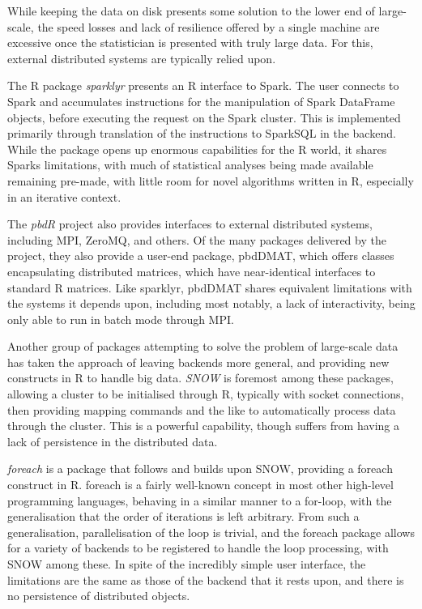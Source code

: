 \documentclass[a4paper,10pt]{article}
\begin{document}
While keeping the data on disk presents some solution to the lower end of
large-scale, the speed losses and lack of resilience offered by a single
machine are excessive once the statistician is presented with truly large data.
For this, external distributed systems are typically relied upon.

The R package \textit{sparklyr} presents an R interface to Spark\cite{luraschi20}.
The user connects to Spark and accumulates instructions for the manipulation of
Spark DataFrame objects, before executing the request on the Spark cluster.
This is implemented primarily through translation of the instructions to
SparkSQL in the backend.
While the package opens up enormous capabilities for the R world, it shares
Sparks limitations, with much of statistical analyses being made available
remaining pre-made, with little room for novel algorithms written in R,
especially in an iterative context.

The \textit{pbdR} project also provides interfaces to external distributed systems,
including MPI, ZeroMQ, and others\cite{pbdR2012}\cite{pbdBASEpackage}.
Of the many packages delivered by the project, they also provide a user-end
package, pbdDMAT, which offers classes encapsulating distributed matrices,
which have near-identical interfaces to standard R matrices.
Like sparklyr, pbdDMAT shares equivalent limitations with the systems it
depends upon, including most notably, a lack of interactivity, being only able
to run in batch mode through MPI.

Another group of packages attempting to solve the problem of large-scale data
has taken the approach of leaving backends more general, and providing new
constructs in R to handle big data.
\textit{SNOW} is foremost among these packages, allowing a cluster to be
initialised through R, typically with socket connections, then providing
mapping commands and the like to automatically process data through the
cluster\cite{tierney18}.
This is a powerful capability, though suffers from having a lack of persistence
in the distributed data.

\textit{foreach} is a package that follows and builds upon SNOW, providing a
foreach construct in R\cite{microsoft20}.
foreach is a fairly well-known concept in most other high-level programming
languages, behaving in a similar manner to a for-loop, with the generalisation
that the order of iterations is left arbitrary.
From such a generalisation, parallelisation of the loop is trivial, and the
foreach package allows for a variety of backends to be registered to handle the
loop processing, with SNOW among these.
In spite of the incredibly simple user interface, the limitations are the same
as those of the backend that it rests upon, and there is no persistence of
distributed objects.
\end{document}
